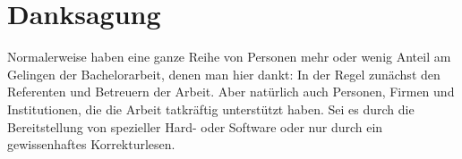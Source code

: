 \chapter{Danksagung}
Normalerweise haben eine ganze Reihe von Personen mehr oder wenig Anteil am Gelingen der Bachelorarbeit, denen man hier dankt: In der Regel zunächst den Referenten und Betreuern der Arbeit. Aber natürlich auch Personen, Firmen und Institutionen, die die Arbeit tatkräftig unterstützt haben. Sei es durch die Bereitstellung von spezieller Hard- oder Software oder nur durch ein gewissenhaftes Korrekturlesen.
\\
